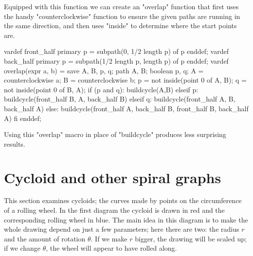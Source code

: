 \documentclass[a4paper,landscape]{article}
\def\mpic#1#2{\vadjust{\moveright5.5in\vbox to 0pt{\hsize4in\vskip#1\centerline{\texttt{[image: \#2]}}\vss}}}
\begin{document}
Equipped with this function we can create an "overlap" function that first uses the
handy "counterclockwise" function to ensure the given paths are running in the
same direction, and then uses "inside" to determine where the start points are.
\begin{smallcode}
vardef front_half primary p = subpath(0, 1/2 length p) of p enddef;
vardef back_half  primary p = subpath(1/2 length p, length p) of p enddef;
vardef overlap(expr a, b) = 
  save A, B, p, q;
  path A, B; boolean p, q;
  A = counterclockwise a;
  B = counterclockwise b;
  p = not inside(point 0 of A, B);
  q = not inside(point 0 of B, A);
  if (p and q): 
    buildcycle(A,B)
  elseif p: 
    buildcycle(front_half B, A, back_half B)
  elseif q: 
    buildcycle(front_half A, B, back_half A)
  else: 
    buildcycle(front_half A, back_half B, front_half B, back_half A)
  fi
enddef;
\end{smallcode}
Using this "overlap" macro in place of "buildcycle" produces less surprising
results.\mpic{-2in}{overlaps4}

\newpage \section{Cycloid and other spiral graphs}

This section examines cycloids; the curves made by points on the circumference of a
rolling wheel.  In the first diagram the cycloid is drawn in red and the
corresponding rolling wheel in blue.  The main idea in this diagram is to make the
whole drawing depend on just a few parameters;  here there are two: the radius $r$
and the amount of rotation $θ$.  If we make $r$ bigger, the drawing will be
scaled up; if we change $θ$, the wheel will appear to have rolled along.
\mpic{-66pt}{cycloids1}
\end{document}
